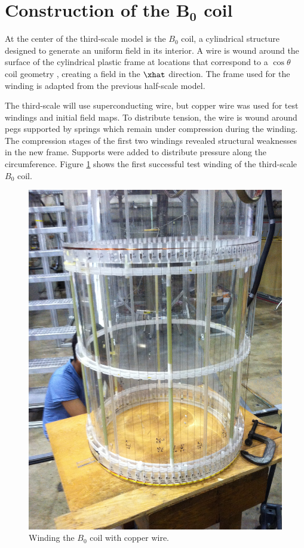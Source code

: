 \documentclass[twocolumn,aps,prb,citeautoscript]{revtex4-1}
\begin{document}
\section{Construction of the $\boldsymbol{B_0}$ coil}

At the center of the third-scale model is the $B_0$ coil, a cylindrical structure designed to generate
an uniform field in its interior. A wire is wound around the surface of the cylindrical
plastic frame at locations
that correspond to a $\cos\theta$ coil geometry \cite{coil}, creating a field in the $\xhat$ direction.
The frame used for the winding is adapted from the previous half-scale model.

The third-scale will use superconducting wire, but copper wire was used for test windings
and initial field maps. To distribute tension, the wire is wound around pegs supported by springs
which remain under compression during the winding. The compression stages of the first two windings revealed
structural weaknesses in the new frame. Supports were added to distribute pressure along the circumference. Figure
\ref{winding} shows the first successful test winding of the third-scale $B_0$ coil.

\begin{figure}
\includegraphics[width=\linewidth]{pics/winding.jpg}
\caption{\label{winding}Winding the $B_0$ coil with copper wire.}
\end{figure}
\end{document}
